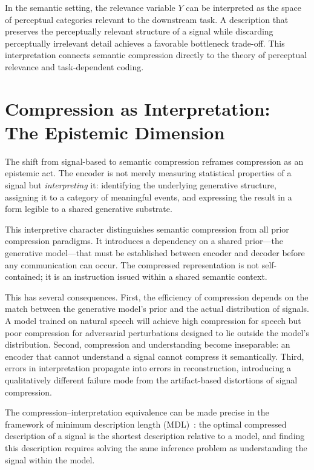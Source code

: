 \documentclass[12pt,a4paper]{article}
\theoremstyle{definition}
\theoremstyle{remark}
\begin{document}
In the semantic setting, the relevance variable $Y$ can be interpreted as the space of perceptual categories relevant to the downstream task. A description that preserves the perceptually relevant structure of a signal while discarding perceptually irrelevant detail achieves a favorable bottleneck trade-off. This interpretation connects semantic compression directly to the theory of perceptual relevance and task-dependent coding.

\section{Compression as Interpretation: The Epistemic Dimension}
\label{sec:interpretation}

The shift from signal-based to semantic compression reframes compression as an epistemic act. The encoder is not merely measuring statistical properties of a signal but \emph{interpreting} it: identifying the underlying generative structure, assigning it to a category of meaningful events, and expressing the result in a form legible to a shared generative substrate.

This interpretive character distinguishes semantic compression from all prior compression paradigms. It introduces a dependency on a shared prior---the generative model---that must be established between encoder and decoder before any communication can occur. The compressed representation is not self-contained; it is an instruction issued within a shared semantic context.

This has several consequences. First, the efficiency of compression depends on the match between the generative model's prior and the actual distribution of signals. A model trained on natural speech will achieve high compression for speech but poor compression for adversarial perturbations designed to lie outside the model's distribution. Second, compression and understanding become inseparable: an encoder that cannot understand a signal cannot compress it semantically. Third, errors in interpretation propagate into errors in reconstruction, introducing a qualitatively different failure mode from the artifact-based distortions of signal compression.

The compression--interpretation equivalence can be made precise in the framework of minimum description length (MDL)~\cite{rissanen}: the optimal compressed description of a signal is the shortest description relative to a model, and finding this description requires solving the same inference problem as understanding the signal within the model.
\end{document}
